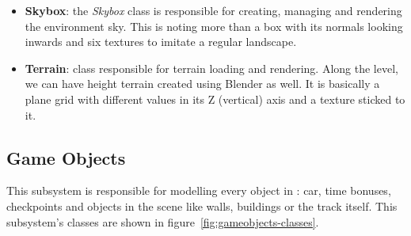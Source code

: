 \begin{itemize}
	\item \textbf{Skybox}: the \textit{Skybox} class is responsible for creating, managing and rendering the
	environment sky. This is noting more than a box with its normals looking inwards and six textures to imitate
	a regular landscape.
	
	\item \textbf{Terrain}: class responsible for terrain loading and rendering. Along the level, we can have
	height terrain created using Blender as well. It is basically a plane grid with different values in its
	Z (vertical) axis and a texture sticked to it.
\end{itemize}

\subsection{Game Objects}

This subsystem is responsible for modelling every object in \game: car, time bonuses, checkpoints and objects
in the scene like walls, buildings or the track itself. This subsystem's classes are shown in
figure~\ref{fig:gameobjects-classes}.


